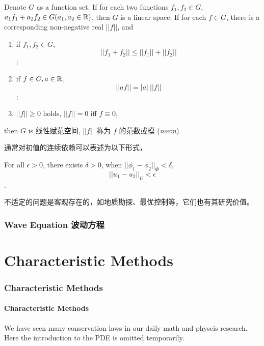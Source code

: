 \begin{definition}
Denote $G$ as a function set. If for each two functions $f_1,f_2\in G$, $a_1 f_1+a_2 f_2\in G (a_1,a_2\in {\mathbb{R}})$, then $G$ is a linear space. If for each $f\in G$, there is a corresponding non-negative real $||f||$, and 
\begin{enumerate}
	\item if $f_1,f_2\in G$, $$||f_1+f_2||\leq ||f_1||+||f_2||$$;
	\item if $f\in G, a\in {\mathbb{R}}$, $$||af||=|a|~ ||f||$$;
	\item $||f||\geq 0$ holds, $||f||=0$ iff $f\equiv 0$,
\end{enumerate} 
then $G$ is 线性赋范空间, $||f||$ 称为 $f$ 的范数或模 (\textit{norm}).
\end{definition}

通常对初值的连续依赖可以表述为以下形式，

For all $\epsilon>0$, there exists $\delta>0$, when $||\phi_1-\phi_2||_\Phi<\delta$, $$||u_1-u_2||_U<\epsilon$$.



不适定的问题是客观存在的，如地质勘探、最优控制等，它们也有其研究价值。

\section{Wave Equation 波动方程}


\part{Characteristic Methods}


\section{Characteristic Methods}
\subsection{Characteristic Methods}
We have seen many conservation laws in our daily math and physcis research. Here the introduction to the PDE is omitted temporarily.
